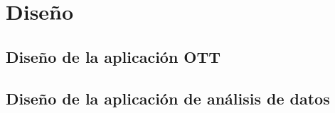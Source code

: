 \chapter{Diseño}
\label{chap:Diseño}



\section{Diseño de la aplicación OTT}
\label{sec:diseno_ott}




\section{Diseño de la aplicación de análisis de datos}
\label{sec:diseno_datos}


